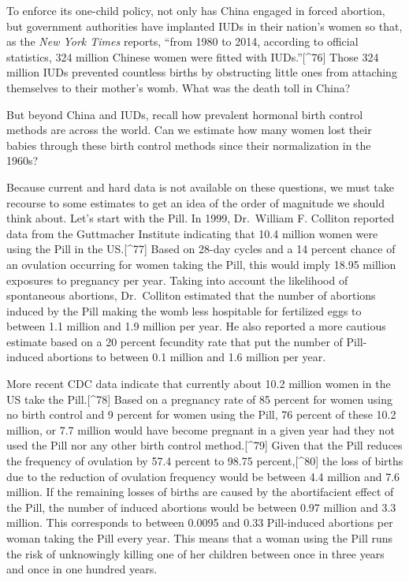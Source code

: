 \documentclass[
]{book}
\begin{document}
To enforce its one-child policy, not only has China engaged in forced abortion, but government authorities have implanted IUDs in their nation's women so that, as the \emph{New York Times} reports, ``from 1980 to 2014, according to official statistics, 324 million Chinese women were fitted with IUDs.''{[}\^{}76{]} Those 324 million IUDs prevented countless births by obstructing little ones from attaching themselves to their mother's womb. What was the death toll in China?

But beyond China and IUDs, recall how prevalent hormonal birth control methods are across the world. Can we estimate how many women lost their babies through these birth control methods since their normalization in the 1960s?

Because current and hard data is not available on these questions, we must take recourse to some estimates to get an idea of the order of magnitude we should think about. Let's start with the Pill. In 1999, Dr.~William F. Colliton reported data from the Guttmacher Institute indicating that 10.4 million women were using the Pill in the US.{[}\^{}77{]} Based on 28-day cycles and a 14 percent chance of an ovulation occurring for women taking the Pill, this would imply 18.95 million exposures to pregnancy per year. Taking into account the likelihood of spontaneous abortions, Dr.~Colliton estimated that the number of abortions induced by the Pill making the womb less hospitable for fertilized eggs to between 1.1 million and 1.9 million per year. He also reported a more cautious estimate based on a 20 percent fecundity rate that put the number of Pill-induced abortions to between 0.1 million and 1.6 million per year.

More recent CDC data indicate that currently about 10.2 million women in the US take the Pill.{[}\^{}78{]} Based on a pregnancy rate of 85 percent for women using no birth control and 9 percent for women using the Pill, 76 percent of these 10.2 million, or 7.7 million would have become pregnant in a given year had they not used the Pill nor any other birth control method.{[}\^{}79{]} Given that the Pill reduces the frequency of ovulation by 57.4 percent to 98.75 percent,{[}\^{}80{]} the loss of births due to the reduction of ovulation frequency would be between 4.4 million and 7.6 million. If the remaining losses of births are caused by the abortifacient effect of the Pill, the number of induced abortions would be between 0.97 million and 3.3 million. This corresponds to between 0.0095 and 0.33 Pill-induced abortions per woman taking the Pill every year. This means that a woman using the Pill runs the risk of unknowingly killing one of her children between once in three years and once in one hundred years.
\end{document}
